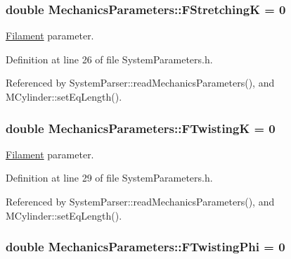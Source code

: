 \hypertarget{structMechanicsParameters_ab4155933a1fc9e47f67ec6ac71efb1bf}{
\subsubsection[{F\+Stretching\+K}]{\setlength{\rightskip}{0pt plus 5cm}double Mechanics\+Parameters\+::\+F\+Stretching\+K = 0}}\label{structMechanicsParameters_ab4155933a1fc9e47f67ec6ac71efb1bf}


\hyperlink{classFilament}{Filament} parameter. 



Definition at line 26 of file System\+Parameters.\+h.



Referenced by System\+Parser\+::read\+Mechanics\+Parameters(), and M\+Cylinder\+::set\+Eq\+Length().

\hypertarget{structMechanicsParameters_af25f0f95ebf55f3f8f02b861bf0a9b2d}{
\subsubsection[{F\+Twisting\+K}]{\setlength{\rightskip}{0pt plus 5cm}double Mechanics\+Parameters\+::\+F\+Twisting\+K = 0}}\label{structMechanicsParameters_af25f0f95ebf55f3f8f02b861bf0a9b2d}


\hyperlink{classFilament}{Filament} parameter. 



Definition at line 29 of file System\+Parameters.\+h.



Referenced by System\+Parser\+::read\+Mechanics\+Parameters(), and M\+Cylinder\+::set\+Eq\+Length().

\hypertarget{structMechanicsParameters_ae108dda4da55a3debc21abf3fbebd3f3}{
\subsubsection[{F\+Twisting\+Phi}]{\setlength{\rightskip}{0pt plus 5cm}double Mechanics\+Parameters\+::\+F\+Twisting\+Phi = 0}}\label{structMechanicsParameters_ae108dda4da55a3debc21abf3fbebd3f3}


